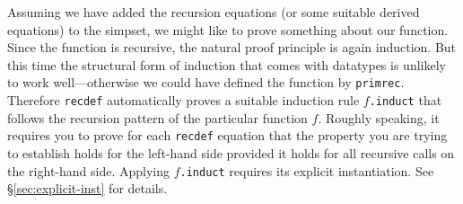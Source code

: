 Assuming we have added the recursion equations (or some suitable derived
equations) to the simpset, we might like to prove something about our
function. Since the function is recursive, the natural proof principle is
again induction. But this time the structural form of induction that comes
with datatypes is unlikely to work well---otherwise we could have defined the
function by \texttt{primrec}. Therefore \texttt{recdef} automatically proves
a suitable induction rule $f$\texttt{.induct} that follows the recursion
pattern of the particular function $f$. Roughly speaking, it requires you to
prove for each \texttt{recdef} equation that the property you are trying to
establish holds for the left-hand side provided it holds for all recursive
calls on the right-hand side. Applying $f$\texttt{.induct} requires its
explicit instantiation. See \S\ref{sec:explicit-inst} for details.

